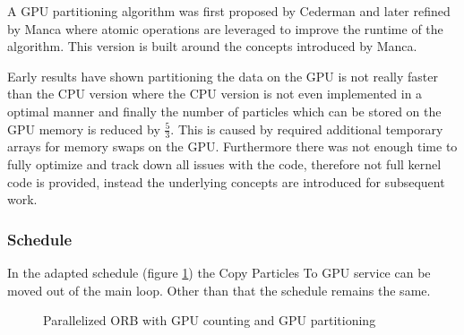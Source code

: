 \documentclass[]{article}
\begin{document}
A GPU partitioning algorithm was first proposed by Cederman \cite{GPUQ} and later refined by Manca \cite{CUDAQ} where atomic operations are leveraged to improve the runtime of the algorithm. This version is built around the concepts introduced by Manca. 

Early results have shown partitioning the data on the GPU is not really faster than the CPU version where the CPU version is not even implemented in a optimal manner and finally the number of particles which can be stored on the GPU memory is reduced by $\frac{5}{3}$. This is caused by required additional temporary arrays for memory swaps on the GPU. Furthermore there was not enough time to fully optimize and track down all issues with the code, therefore not full kernel code is provided, instead the underlying concepts are introduced for subsequent work. 

\subsubsection{Schedule}

In the adapted schedule (figure \ref{fig:orbgpu3}) the Copy Particles To GPU service can be moved out of the main loop. Other than that the schedule remains the same. 

\begin{figure}[H]
	\begin{center}
	\end{center}
	\caption{Parallelized ORB with GPU counting and GPU partitioning}
	\label{fig:orbgpu3}
\end{figure}
\end{document}
